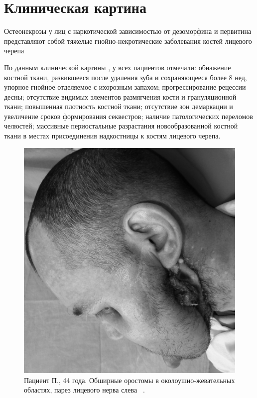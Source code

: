 \documentclass[11pt]{article}
\begin{document}
	\section{Клиническая картина}
	Остеонекрозы  у  лиц  с  наркотической  зависимостью от дезоморфина и первитина представляют собой тяжелые  гнойно-некротические  заболевания  костей лицевого черепа ~\cite{rsj_1,rsj_2,rsj_3,rsj_4,rsj_5,rsj_6,rsj_7,rsj_8,rsj_9,rsj_10,rsj_11,rsj_12,rsj_13,rsj_14,rsj_15}
	
	По данным клинической картины , у всех пациентов отмечали: обнажение костной ткани, развившееся после удаления зуба и сохраняющееся более 8 нед, упорное  гнойное  отделяемое  с  ихорозным  запахом; прогрессирование рецессии десны; отсутствие видимых элементов размягчения кости и грануляционной ткани; повышенная плотность костной ткани; отсутствие зон демаркации и увеличение сроков формирования секвестров; наличие патологических переломов челюстей; массивные периостальные разрастания новообразованной костной ткани в местах присоединения надкостницы к костям лицевого черепа.~\cite{rsj}
	
	\begin{figure}[H]
		\centering
		\includegraphics[width=\textwidth]{ris_1}
		\caption{Пациент  П., 44 года. Обширные оростомы в околоушно-жевательных областях, парез лицевого нерва слева ~\cite{rsj}.}
		\label{fig:ris_1}
	\end{figure}
\end{document}
